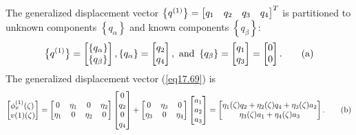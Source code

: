 \documentclass{AeroStructure-ERJohnson}
\begin{document}
\begin{example}
The generalized displacement vector $\left\{q^{(1)}\right\}=\left[\begin{array}{@{}llll@{}}q_{1} & q_{2} & q_{3} & q_{4}\end{array}\right]^{T}$ is partitioned to unknown components $\left\{q_{\alpha}\right\}$ and known components $\left\{q_{\beta}\right\}$:
\begin{equation}
\big\{q^{(1)}\big\}=\left[\begin{array}{@{}l@{}}\left\{q_{\alpha}\right\} \\\left\{q_{\beta}\right\}\end{array}\right], \left\{q_{\alpha}\right\}=\left[\begin{array}{@{}l@{}}q_{2} \\q_{4}\end{array}\right], \textrm{ and } \left\{q_{\beta}\right\}=\left[\begin{array}{@{}l@{}}q_{1} \\q_{3}\end{array}\right]=\left[\begin{array}{@{}l@{}}0 \\0\end{array}\right]. \label{eq17.3.a}\tag{a}
\end{equation}
The generalized displacement vector (\ref{eq17.69}) is
\begin{equation}
\left[\begin{array}{@{}l@{}}\phi_{x}^{(1)}(\zeta) \\v(1)(\zeta)\end{array}\right]=\left[\begin{array}{@{}cccc@{}}0 & \eta_{1} & 0 & \eta_{2} \\\eta_{1} & 0 & \eta_{2} & 0\end{array}\right]\left[\begin{array}{@{}c@{}}0 \\q_{2} \\0 \\q_{4}\end{array}\right]+\left[\begin{array}{@{}ccc@{}}0 & \eta_{3} & 0 \\\eta_{3} & 0 & \eta_{4}\end{array}\right]\left[\begin{array}{@{}c@{}}a_{1} \\a_{2} \\a_{3}\end{array}\right]=\left[\begin{array}{@{}c@{}}\eta_{1}(\zeta) q_{2}+\eta_{2}(\zeta) q_{4}+\eta_{3}(\zeta) a_{2} \\\eta_{3}(\zeta) a_{1}+\eta_{4}(\zeta) a_{3}\end{array}\right]. \label{eq17.3.b}\tag{b}

\end{equation}
\end{example}
\end{document}
